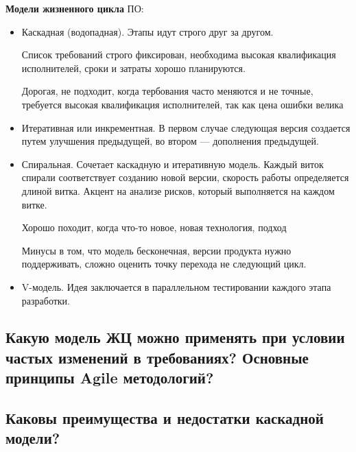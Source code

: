 \textbf{Модели жизненного цикла} ПО:
\begin{itemize}
    \item Каскадная (водопадная). Этапы идут строго друг за другом.

        Список
        требований строго фиксирован, необходима высокая квалификация
        исполнителей, сроки и затраты хорошо планируются. 

        Дорогая, не подходит, когда тербования часто меняются и не точные,
        требуется высокая квалификация исполнителей, так как цена ошибки велика


    \item Итеративная или инкрементная. В первом случае следующая версия
        создается путем улучшения предыдущей, во втором --- дополнения
        предыдущей.


    \item Спиральная. Сочетает каскадную и итеративную модель. Каждый виток
        спирали соответствует созданию новой версии, скорость работы
        определяется длиной витка. Акцент на анализе рисков, который
        выполняется на каждом витке.

        Хорошо походит, когда что-то новое, новая технология, подход

        Минусы в том, что модель бесконечная, версии продукта нужно
        поддерживать, сложно оценить точку перехода не следующий цикл.


    \item V-модель. Идея заключается в параллельном тестировании каждого этапа
        разработки.

\end{itemize}

\subsection{Какую модель ЖЦ можно применять при условии частых изменений в
требованиях? Основные принципы Agile методологий?}

\subsection{Каковы преимущества и недостатки каскадной модели?}

